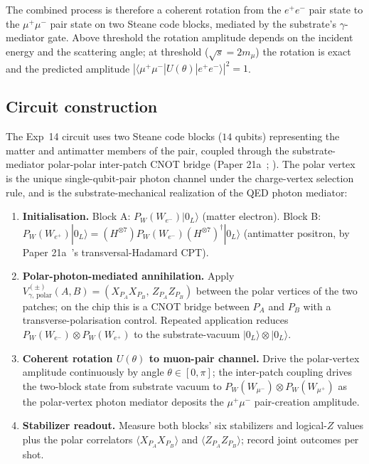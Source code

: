 \documentclass[11pt]{article}
\begin{document}
The combined process is therefore a coherent rotation from the $e^+ e^-$ pair state to the $\mu^+ \mu^-$ pair state on two Steane code blocks, mediated by the substrate's $\gamma$-mediator gate.  Above threshold the rotation amplitude depends on the incident energy and the scattering angle; at threshold ($\sqrt{s} = 2 m_\mu$) the rotation is exact and the predicted amplitude $|\langle \mu^+ \mu^- | U(\theta) | e^+ e^- \rangle|^2 = 1$.

\subsection{Circuit construction}
\label{sec:emumu-circuit}

The Exp~14 circuit uses two Steane code blocks ($14$ qubits) representing the matter and antimatter members of the pair, coupled through the substrate-mediator polar-polar inter-patch CNOT bridge (Paper 21a~\cite[\S 3.6]{Paper21a}; \cite{BosonMemo}).  The polar vertex is the unique single-qubit-pair photon channel under the charge-vertex selection rule, and is the substrate-mechanical realization of the QED photon mediator:

\begin{enumerate}
\item \textbf{Initialisation.}  Block A: $P_W(W_{e^-}) |0_L\rangle$ (matter electron).  Block B: $P_W(W_{e^+}) |0_L\rangle = (H^{\otimes 7}) P_W(W_{e^-}) (H^{\otimes 7})^\dagger |0_L\rangle$ (antimatter positron, by Paper 21a~\cite[\S 5.3]{Paper21a}'s transversal-Hadamard CPT).
\item \textbf{Polar-photon-mediated annihilation.}  Apply $V_{\gamma,\,\text{polar}}^{(\pm)}(A, B) = (X_{P_A} X_{P_B},\, Z_{P_A} Z_{P_B})$ between the polar vertices of the two patches; on the chip this is a CNOT bridge between $P_A$ and $P_B$ with a transverse-polarisation control.  Repeated application reduces $P_W(W_{e^-}) \otimes P_W(W_{e^+})$ to the substrate-vacuum $|0_L\rangle \otimes |0_L\rangle$.
\item \textbf{Coherent rotation $U(\theta)$ to muon-pair channel.}  Drive the polar-vertex amplitude continuously by angle $\theta \in [0, \pi]$; the inter-patch coupling drives the two-block state from substrate vacuum to $P_W(W_{\mu^-}) \otimes P_W(W_{\mu^+})$ as the polar-vertex photon mediator deposits the $\mu^+ \mu^-$ pair-creation amplitude.
\item \textbf{Stabilizer readout.}  Measure both blocks' six stabilizers and logical-$Z$ values plus the polar correlators $\langle X_{P_A} X_{P_B} \rangle$ and $\langle Z_{P_A} Z_{P_B} \rangle$; record joint outcomes per shot.
\end{enumerate}
\end{document}
